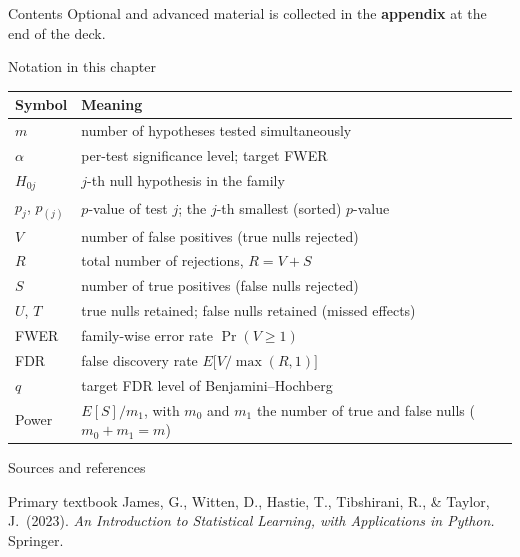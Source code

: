 \documentclass[aspectratio=169,11pt]{beamer}
\begin{document}
\begin{frame}{Contents}\small\tableofcontents[hideallsubsections]
  \vfill
  {\tiny Optional and advanced material is collected in the \textbf{appendix} at the end of the deck.}
\end{frame}

\begin{frame}{Notation in this chapter}
  \footnotesize
  \begin{center}
  \begin{tabular}{@{}ll@{}}
    \toprule
    \textbf{Symbol} & \textbf{Meaning} \\
    \midrule
    $m$ & number of hypotheses tested simultaneously \\
    $\alpha$ & per-test significance level; target FWER \\
    $H_{0j}$ & $j$-th null hypothesis in the family \\
    $p_j$, $p_{(j)}$ & $p$-value of test $j$; the $j$-th smallest (sorted) $p$-value \\
    $V$ & number of false positives (true nulls rejected) \\
    $R$ & total number of rejections, $R=V+S$ \\
    $S$ & number of true positives (false nulls rejected) \\
    $U$, $T$ & true nulls retained; false nulls retained (missed effects) \\
    FWER & family-wise error rate $\Pr(V\ge 1)$ \\
    FDR & false discovery rate $E\big[V/\max(R,1)\big]$ \\
    $q$ & target FDR level of Benjamini--Hochberg \\
    Power & $E[S]/m_1$, with $m_0$ and $m_1$ the number of true and false nulls ($m_0+m_1=m$) \\
    \bottomrule
  \end{tabular}
  \end{center}
\end{frame}

\begin{frame}{Sources and references}
  \begin{block}{Primary textbook}
    James, G., Witten, D., Hastie, T., Tibshirani, R., \& Taylor, J.\ (2023).
    \emph{An Introduction to Statistical Learning, with Applications in
    Python.} Springer.
  \end{block}
\end{frame}
\end{document}
